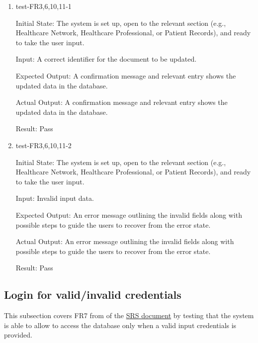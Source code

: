 \documentclass[12pt, titlepage]{article}
\begin{document}
\begin{enumerate}

  \item{test-FR3,6,10,11-1} \label{test-FR3,6,10,11-1}
  
  Initial State: The system is set up, open to the relevant section (e.g., Healthcare Network, Healthcare Professional, or Patient Records), and ready to take the user input.

  Input: A correct identifier for the document to be updated.

  Expected Output: A confirmation message and relevant entry shows the updated data in the database.

  Actual Output: A confirmation message and relevant entry shows the updated data in the database.

  Result: Pass


  \item{test-FR3,6,10,11-2} \label{test-FR3,6,10,11-2}

  Initial State:  The system is set up, open to the relevant section (e.g., Healthcare Network, Healthcare Professional, or Patient Records), and ready to take the user input.

  Input: Invalid input data.

  Expected Output: An error message outlining the invalid fields along with possible steps to guide the users to recover from the error state.

  Actual Output: An error message outlining the invalid fields along with possible steps to guide the users to recover from the error state.

  Result: Pass

\end{enumerate}

\subsection{Login for valid/invalid credentials} \label{section:3.4}

This subsection covers FR7 from of the \href{https://github.com/Inreet-Kaur/capstone/blob/main/docs/SRS/SRS.pdf} {SRS document} by testing that the system is able to allow to access the database only when a valid input credentials is provided.
\end{document}
